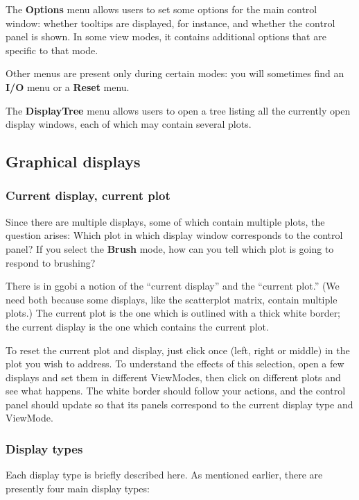 \documentclass[11pt]{article}
\begin{document}
The {\bf Options} menu allows users to set some options for the
main control window:  whether tooltips are displayed, for instance,
and whether the control panel is shown.  In some view modes, it contains
additional options that are specific to that mode.

Other menus are present only during certain modes:  you will
sometimes find an {\bf I/O} menu or a {\bf Reset} menu.

The {\bf DisplayTree} menu allows users to open a tree listing
all the currently open display windows, each of which may contain
several plots.

\subsection{Graphical displays}
\label{slbl:GraphicalDisplays}

\subsubsection{Current display, current plot}

Since there are multiple displays, some of which contain multiple
plots, the question arises:  Which plot in which display window
corresponds to the control panel?  If you select the {\bf Brush} mode,
how can you tell which plot is going to respond to
brushing?

There is in ggobi a notion of the ``current display'' and the
``current plot.''  (We need both because some displays, like the
scatterplot matrix, contain multiple plots.) The current plot is the
one which is outlined with a thick white border; the current display
is the one which contains the current plot.

To reset the current plot and display, just click once (left, right
or middle) in the plot you wish to address.  To understand the
effects of this selection, open a few displays and set them in
different ViewModes, then click on different plots and see what
happens.  The white border should follow your actions, and the
control panel should update so that its panels correspond to the
current display type and ViewMode.

\subsubsection{Display types}
\label{DisplayTypes}

Each display type is briefly described here. 
As mentioned earlier, there are presently four main display types:
\end{document}
